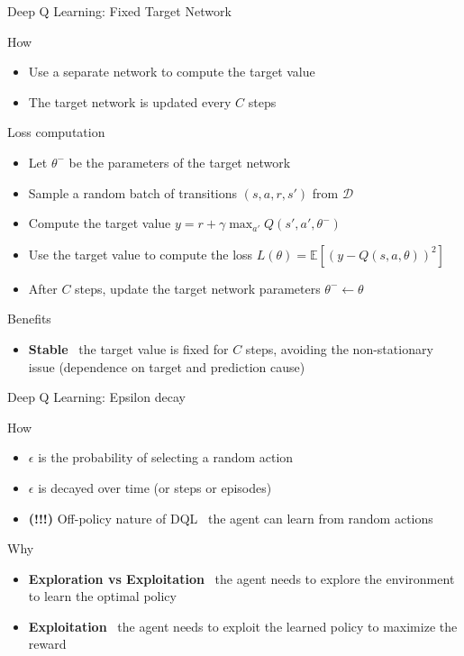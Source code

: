 \documentclass[presentation, 9pt]{beamer}\mode<presentation>{\usetheme{AMSBolognaFC}}
\begin{document}
\begin{frame}{Deep Q Learning: Fixed Target Network}
	\centering
	\begin{block}{How}
		\begin{itemize}
			\item Use a separate network to compute the target value
			\item The target network is updated every $C$ steps
		\end{itemize}
	\end{block}
	\begin{block}{Loss computation}
		\begin{itemize}
			\item Let $\theta^-$ be the parameters of the target network
			\item Sample a random batch of transitions $(s, a, r, s')$ from $\mathcal{D}$
			\item Compute the target value $y = r + \gamma \max_{a'} Q(s', a', \theta^-)$
			\item Use the target value to compute the loss $L(\theta) = \mathbb{E}[(y - Q(s, a, \theta))^2]$
			\item After $C$ steps, update the target network parameters $\theta^- \leftarrow \theta$
		\end{itemize}
	\end{block}
	\begin{alertblock}{Benefits}
		\begin{itemize}
			\item \textbf{Stable} \faArrowRight \, the target value is fixed for $C$ steps, avoiding the non-stationary issue (dependence on target and prediction cause)
		\end{itemize}
	\end{alertblock}
\end{frame}
\begin{frame}{Deep Q Learning: Epsilon decay}
	\begin{block}{How}
		\begin{itemize}
			\item $\epsilon$ is the probability of selecting a random action
			\item $\epsilon$ is decayed over time (or steps or episodes)
			\item \textbf{(!!!)} Off-policy nature of DQL \faArrowRight \, the agent can learn from random actions
		\end{itemize}
	\end{block}
	\begin{block}{Why}
		\begin{itemize}
			\item \textbf{Exploration vs Exploitation} \faArrowRight \, the agent needs to explore the environment to learn the optimal policy
			\item \textbf{Exploitation} \faArrowRight \, the agent needs to exploit the learned policy to maximize the reward
		\end{itemize}
	\end{block}
	
\end{frame}
\end{document}
